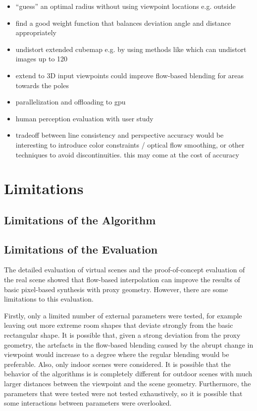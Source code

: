 \begin{itemize}
  \item ``guess'' an optimal radius without using viewpoint locations e.g. outside
  \item find a good weight function that balances deviation angle and distance appropriately
  \item undistort extended cubemap e.g. by using methods like \cite{fov} which can undistort images up to 120\degree
  \item extend to 3D \ar input viewpoints could improve flow-based blending for areas towards the poles
  \item parallelization and offloading to gpu
  \item human perception evaluation with user study
  \item tradeoff between line consistency and perspective accuracy \ar would be interesting to introduce color constraints / optical flow smoothing, or other techniques to avoid discontinuities. this may come at the cost of accuracy
\end{itemize}


\section{Limitations}
\subsection{Limitations of the Algorithm}
\subsection{Limitations of the Evaluation}
The detailed evaluation of virtual scenes and the proof-of-concept evaluation of the real scene showed that flow-based interpolation can improve the results of basic pixel-based synthesis with proxy geometry. However, there are some limitations to this evaluation.

Firstly, only a limited number of external parameters were tested, for example leaving out more extreme room shapes that deviate strongly from the basic rectangular shape. It is possible that, given a strong deviation from the proxy geometry, the artefacts in the flow-based blending caused by the abrupt change in viewpoint would increase to a degree where the regular blending would be preferable. Also, only indoor scenes were considered. It is possible that the behavior of the algorithms is is completely different for outdoor scenes with much larger distances between the viewpoint and the scene geometry. Furthermore, the parameters that were tested were not tested exhaustively, so it is possible that some interactions between parameters were overlooked.

